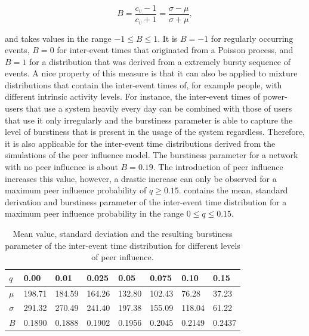 \begin{equation}
    B = \frac{c_{v} - 1}{c_{v} + 1} = \frac{\sigma - \mu}{\sigma + \mu},
\end{equation}

and takes values in the range \( -1 \leq B \leq 1 \).
It is \( B = -1 \) for regularly occurring events, \( B = 0 \) for inter-event times that originated from a Poisson process, and \( B = 1 \) for a distribution that was derived from a extremely bursty sequence of events.
A nice property of this measure is that it can also be applied to mixture distributions that contain the inter-event times of, for example people, with different intrinsic activity levels.
For instance, the inter-event times of power-users that use a system heavily every day can be combined with those of users that use it only irregularly and the burstiness parameter is able to capture the level of burstiness that is present in the usage of the system regardless.
Therefore, it is also applicable for the inter-event time distributions derived from the simulations of the peer influence model.
The burstiness parameter for a network with no peer influence is about \( B = 0.19 \).
The introduction of peer influence increases this value, however, a drastic increase can only be observed for a maximum peer influence probability of \( q \ge 0.15 \).
 contains the mean, standard derivation and burstiness parameter of the inter-event time distribution for a maximum peer influence probability in the range \( 0 \leq q \leq 0.15 \).


\begin{table}[htbp]
\centering
\begin{tabular}{llllllll}
\( q \) & 0.00 & 0.01 & 0.025 & 0.05 & 0.075 & 0.10 & 0.15 \\ \hline
\( \mu \) & 198.71 & 184.59 & 164.26 & 132.80 & 102.43 & 76.28 & 37.23 \\ \hline
\( \sigma \) & 291.32 & 270.49 & 241.40 & 197.38 & 155.09 & 118.04 & 61.22 \\ \hline
\( B \) & 0.1890 & 0.1888 & 0.1902 & 0.1956 & 0.2045 & 0.2149 & 0.2437
\end{tabular}

\caption[Burstiness of inter-event time distributions]{Mean value, standard deviation and the resulting burstiness parameter of the inter-event time distribution for different levels of peer influence.}
\label{tbl:burstiness-parameter}
\end{table}



